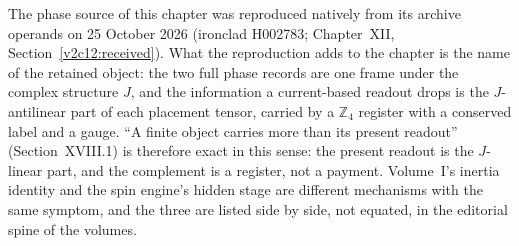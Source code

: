 The phase source of this chapter was reproduced natively from its archive operands on 25 October 2026 (ironclad H002783; Chapter~XII, Section~\ref{v2c12:received}). What the reproduction adds to the chapter is the name of the retained object: the two full phase records are one frame under the complex structure $J$, and the information a current-based readout drops is the $J$-antilinear part of each placement tensor, carried by a $\mathbb Z_4$ register with a conserved label and a gauge. ``A finite object carries more than its present readout'' (Section~XVIII.1) is therefore exact in this sense: the present readout is the $J$-linear part, and the complement is a register, not a payment. Volume~I's inertia identity and the spin engine's hidden stage are different mechanisms with the same symptom, and the three are listed side by side, not equated, in the editorial spine of the volumes.
